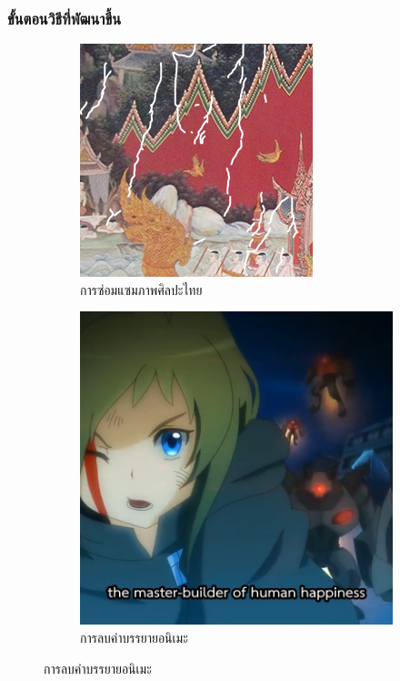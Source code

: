 \documentclass[xcolor=dvipsnames, xetex,serif]{beamer}
\numberwithin{equation}{section}
\begin{document}
	\begin{frame}
		\frametitle{ขั้นตอนวิธีที่พัฒนาขึ้น}
		\begin{figure}[H]
			\centering
			\begin{subfigure}{0.4\linewidth}
				\centering
				\includegraphics[width=0.8\linewidth]{images/our_method/preview_thaiart.png}
				\caption*{{\large การซ่อมแซมภาพศิลปะไทย}}
			\end{subfigure}
			\begin{subfigure}{0.4\linewidth}
				\centering
				\includegraphics[width=0.8\linewidth]{images/our_method/preview_anime_square.png}
				\caption*{{\large การลบคำบรรยายอนิเมะ}}
			\end{subfigure}
		\end{figure}
	\end{frame}
\end{document}
